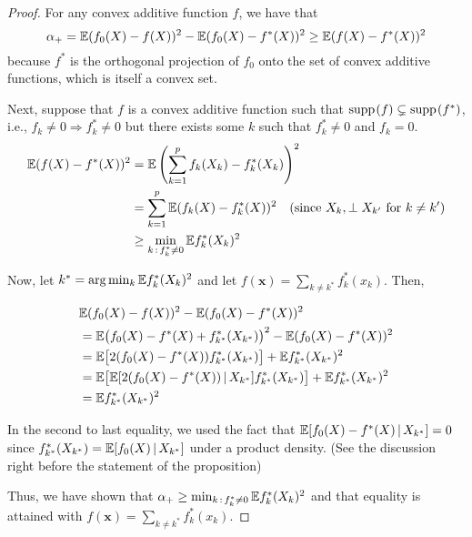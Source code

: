 \documentclass[12pt,pdftex,aos,noinfoline,addressasfootnote]{imsart}
\begin{document}
\begin{proof}

For any convex additive function $f$, we have that
\[
\alpha_+ = {\mathbb E} (f_0(X) - f(X))^2 - {\mathbb E} (f_0(X) - f^*(X))^2 \geq {\mathbb E} (f(X) - f^*(X))^2
\]
because $f^*$ is the orthogonal projection of $f_0$ onto the set of convex additive functions, which is itself a convex set. 

Next, suppose that $f$ is a convex additive function such that $\mathop{\text{supp}\kern.2ex}(f) \subsetneq \mathop{\text{supp}\kern.2ex}(f^*)$, i.e., $f_k \neq 0 \Rightarrow f^*_k \neq 0$ but there exists some $k$ such that $f^*_k \neq 0$ and $f_k = 0$. 
\begin{align*}
{\mathbb E} (f(X) - f^*(X))^2 & = {\mathbb E} \left( \sum_{k=1}^p f_k(X_k) - f^*_k(X_k) \right)^2 \\
   &= \sum_{k=1}^p {\mathbb E} (f_k(X) - f^*_k(X))^2  \quad \textrm{(since $X_k, \perp X_{k'}$ for $k \neq k'$)} \\
   &\geq \min_{k \,:\, f^*_k \neq 0} {\mathbb E} f^*_k(X_k)^2 
\end{align*}

Now, let $k^* = \arg\min_k {\mathbb E} f^*_k(X_k)^2$ and let $f(\mathbf{x}) = \sum_{k\neq k^*} f_k^*(x_k)$. Then,

\begin{align*}
& {\mathbb E} (f_0(X) - f(X))^2 - {\mathbb E} (f_0(X) - f^*(X))^2 \\
 &=
   {\mathbb E} \big(f_0(X) - f^*(X) + f^*_{k^*}(X_{k^*}) \big)^2 - {\mathbb E}( f_0(X) - f^*(X))^2 \\
 &= {\mathbb E} \big[ 2(f_0(X) - f^*(X)) f^*_{k^*} (X_{k^*}) \big] + {\mathbb E} f^*_{k^*}(X_{k^*})^2 \\
 &= {\mathbb E}\big[ {\mathbb E}[ 2(f_0(X) - f^*(X)) {\,|\,} X_{k^*}] f^*_{k^*}(X_{k^*}) \big] + {\mathbb E} f^*_{k^*}(X_{k^*})^2 \\
 &= {\mathbb E} f^*_{k^*}(X_{k^*})^2 
\end{align*}

In the second to last equality, we used the fact that ${\mathbb E}[ f_0(X) - f^*(X) {\,|\,} X_{k^*}] = 0$ since $f^*_{k^*}(X_{k^*}) = {\mathbb E}[ f_0(X) {\,|\,} X_{k^*} ]$ under a product density. (See the discussion right before the statement of the proposition)

Thus, we have shown that $\alpha_+ \geq \min_{k \,:\, f^*_k \neq 0} {\mathbb E} f_k^*(X_k)^2$ and that equality is attained with $f(\mathbf{x}) = \sum_{k\neq k^*} f_k^*(x_k)$. 

\end{proof}

\end{document}
